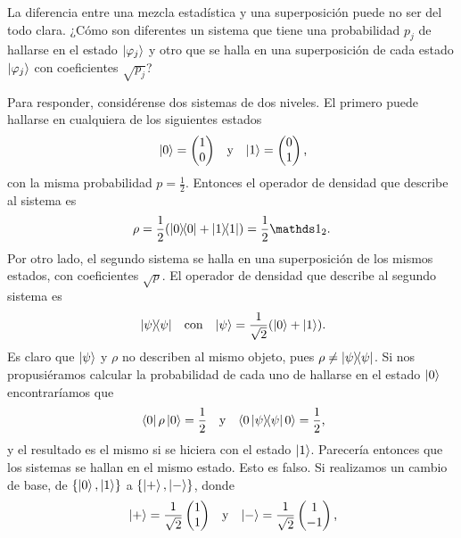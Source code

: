 La diferencia entre una mezcla estadística y una superposición puede no ser del todo clara. ¿Cómo son diferentes un sistema que tiene una probabilidad $p_{j}$ de hallarse en el estado $\ket{\varphi_{j}}$ y otro que se halla en una superposición de cada estado $\ket{\varphi_{j}}$ con coeficientes $\sqrt{p_{j}}$? 

Para responder, considérense dos sistemas de dos niveles. El primero puede hallarse en cualquiera de los siguientes estados
\begin{align}
    \ket{0}=\begin{pmatrix}
        1\\
        0
    \end{pmatrix} && \text{y} && \ket{1}=\begin{pmatrix}
        0\\
        1
    \end{pmatrix}\rlap{,}\nonumber
\end{align}
con la misma probabilidad $p=\frac{1}{2}$. Entonces el operador de densidad que describe al sistema es 
\begin{equation}
    \rho=\frac{1}{2}(\dyad{0}+\dyad{1})=\frac{1}{2}\Id_{2}.\nonumber
\end{equation}
Por otro lado, el segundo sistema se halla en una superposición de los mismos estados, con coeficientes $\sqrt{p}$. El operador de densidad que describe al segundo sistema es 
\begin{align}
    \dyad{\psi} && \text{con} && \ket{\psi}=\frac{1}{\sqrt{2}}(\ket{0}+\ket{1})\rlap{.}\nonumber
\end{align}
Es claro que $\ket{\psi}$ y $\rho$ no describen al mismo objeto, pues $\rho\neq\dyad{\psi}$. Si nos propusiéramos calcular la probabilidad de cada uno de hallarse en el estado $\ket{0}$ encontraríamos que
\begin{align}
    \bra{0}\rho\ket{0}=\frac{1}{2} && \text{y} &&\langle 0 \dyad{\psi} 0\rangle=\frac{1}{2}\rlap{,}\nonumber
\end{align}
y el resultado es el mismo si se hiciera con el estado $\ket{1}$. Parecería entonces que los sistemas se hallan en el mismo estado. Esto es falso. Si realizamos un cambio de base, de $\{\ket{0},\ket{1}\}$ a $\{\ket{+},\ket{-}\}$, donde
\begin{align}
    \ket{+}=\frac{1}{\sqrt{2}}\begin{pmatrix}
        1\\
        1
    \end{pmatrix} && \text{y} && \ket{-}=\frac{1}{\sqrt{2}}\begin{pmatrix}
        1\\
        -1
    \end{pmatrix}\rlap{,}\nonumber
\end{align}
